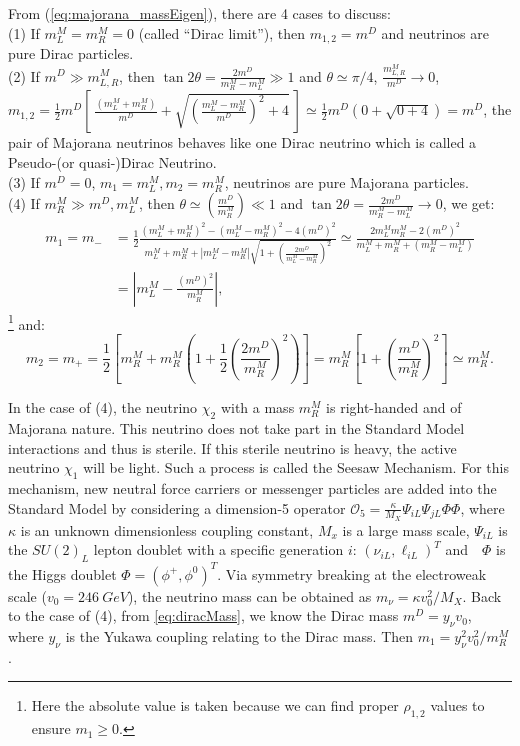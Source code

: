 From (\ref{eq:majorana_massEigen}), there are 4 cases to discuss:\\
(1) If $m_L^M=m_R^M=0$ (called ``Dirac limit''), then $m_{1,2}=m^D$ and neutrinos are pure Dirac particles.\\
(2) If $m^D\gg m^M_{L,R}$, then $\tan 2\theta=\frac{2m^D}{m^M_R-m^M_L}\gg 1$ and $\theta\simeq \pi/4$, $\frac{m_{L,R}^M}{m^D}\to 0$, $m_{1,2}=\frac{1}{2}m^D[~\frac{(m_L^M+m_R^M)}{m^D}+\sqrt{(\frac{m^M_L-m^M_R}{m^D})^2+4}~]\simeq\frac{1}{2}m^D(0+\sqrt{0+4})= m^D$, the pair of Majorana neutrinos behaves like one Dirac neutrino which is called a Pseudo-(or quasi-)Dirac Neutrino.
\\
(3) If $m^D=0$, $m_1=m^M_L, m_2=m^M_R$, neutrinos are pure Majorana particles.\\
(4) If $m_R^M\gg m^D, m_L^M$, then $\theta\simeq(\frac{m^D}{m_R^M})\ll 1$ and $\tan 2\theta=\frac{2m^D}{m^M_R-m^M_L}\to 0$, we get:
\begin{equation}
\begin{aligned}
m_1=m_-&=\frac{1}{2}\frac{(m^M_L+m^M_R)^2-(m^M_L-m^M_R)^2-4(m^D)^2}{m^M_L+m^M_R+|m^M_L-m^M_R|\sqrt{1+(\frac{2m^D}{m^M_L-m^M_R})^2}}\simeq 
\frac{2m^M_Lm^M_R-2(m^D)^2}{m_L^M+m_R^M+(m_R^M-m_L^M)}\\
&=|m^M_L-\frac{(m^D)^2}{m^M_R}|,
\end{aligned}
\end{equation}\footnote{Here the absolute value is taken because we can find proper $\rho_{1,2}$ values to ensure $m_1\geq 0$.}
and:
\begin{equation}
m_2=m_+=\frac{1}{2}[m^M_R+m^M_R(1+\frac{1}{2}(\frac{2m^D}{m^M_R})^2)]=m^M_R[1+(\frac{m^D}{m^M_R})^2]\simeq m^M_R.
\end{equation}

In the case of (4), the neutrino $\chi_2$ with a mass $m^M_R$ is right-handed and of Majorana nature. This neutrino does not take part in the Standard Model interactions and thus is sterile. If this sterile neutrino is heavy, the active neutrino $\chi_1$ will be light. Such a process is called the Seesaw Mechanism. For this mechanism, new neutral force carriers or messenger particles are added into the Standard Model by considering a dimension-5 operator $\mathcal{O}_5=\frac{\kappa}{M_X}\Psi_{iL}\Psi_{jL}\Phi\Phi$, where $\kappa$ is an unknown dimensionless coupling constant, $M_x$ is a large mass scale, $\Psi_{iL}$ is the $SU(2)_L$ lepton doublet with a specific generation $i$: $(\nu_{iL}, \ell_{iL})^T$ and　$\Phi$ is the Higgs doublet $\Phi=(\phi^+,\phi^0)^T$\cite{barger2012physics}. Via symmetry breaking at the electroweak scale ($v_0=246~GeV$), the neutrino mass can be obtained as 
$m_\nu=\kappa v_0^2/M_X$. Back to the case of (4), from \ref{eq:diracMass}, we know the Dirac mass $m^D= y_\nu v_0$, where $y_\nu$ is the Yukawa coupling relating to the Dirac mass. Then $m_1=y^2_\nu v_0^2/m^M_R$. 






